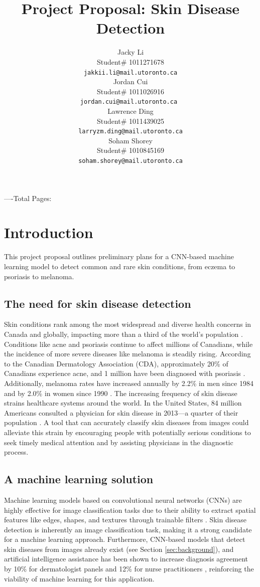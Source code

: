 \documentclass{article} %
\title{Project Proposal: Skin Disease Detection}
\author{Jacky Li  \\
Student\# 1011271678\\
\texttt{jakkii.li@mail.utoronto.ca} \\
\And
Jordan Cui  \\
Student\# 1011026916 \\
\texttt{jordan.cui@mail.utoronto.ca \phantom{    }} \\
\AND
Lawrence Ding  \\
Student\# 1011439025 \\
\texttt{larryzm.ding@mail.utoronto.ca} \\
\And
Soham Shorey \\
Student\# 1010845169 \\
\texttt{soham.shorey@mail.utoronto.ca} \\
\AND
}
\begin{document}
\maketitle
\vspace{-1.5cm}
----Total Pages: \pageref{last_page}

\section{Introduction}

This project proposal outlines preliminary plans for a CNN-based machine learning model to detect common and rare skin conditions, from eczema to psoriasis to melanoma.

\subsection{The need for skin disease detection}

Skin conditions rank among the most widespread and diverse health concerns in Canada and globally, impacting more than a third of the world's population \citep{li2024large}. Conditions like acne and psoriasis continue to affect millions of Canadians, while the incidence of more severe diseases like melanoma is steadily rising. According to the Canadian Dermatology Association (CDA), approximately 20\% of Canadians experience acne, and 1 million have been diagnosed with psoriasis \citep{cda2025skin}. Additionally, melanoma rates have increased annually by 2.2\% in men since 1984 and by 2.0\% in women since 1990 \citep{cda2025melanoma}. The increasing frequency of skin disease strains healthcare systems around the world. In the United States, 84 million Americans consulted a physician for skin disease in 2013—a quarter of their population \citep{aad2025burden}. A tool that can accurately classify skin diseases from images could alleviate this strain by encouraging people with potentially serious conditions to seek timely medical attention and by assisting physicians in the diagnostic process.

\subsection{A machine learning solution}

Machine learning models based on convolutional neural networks (CNNs) are highly effective for image classification tasks due to their ability to extract spatial features like edges, shapes, and textures through trainable filters \citep{huang2023image}. Skin disease detection is inherently an image classification task, making it a strong candidate for a machine learning approach. Furthermore, CNN-based models that detect skin diseases from images already exist (see Section \ref{sec:background}), and artificial intelligence assistance has been shown to increase diagnosis agreement by 10\% for dermatologist panels and 12\% for nurse practitioners \citep{liu2021development}, reinforcing the viability of machine learning for this application.
\end{document}
